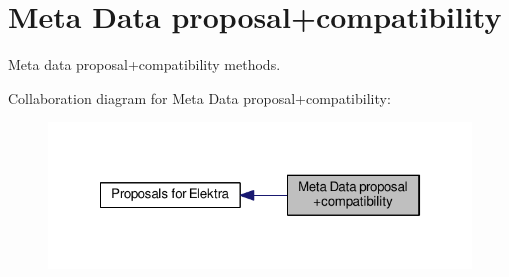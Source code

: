 \hypertarget{group__meta}{\section{Meta Data proposal+compatibility}
\label{group__meta}
}


Meta data proposal+compatibility methods.  


Collaboration diagram for Meta Data proposal+compatibility\+:
\nopagebreak
\begin{figure}[H]
\begin{center}
\leavevmode
\includegraphics[width=322pt]{group__meta}
\end{center}
\end{figure}
